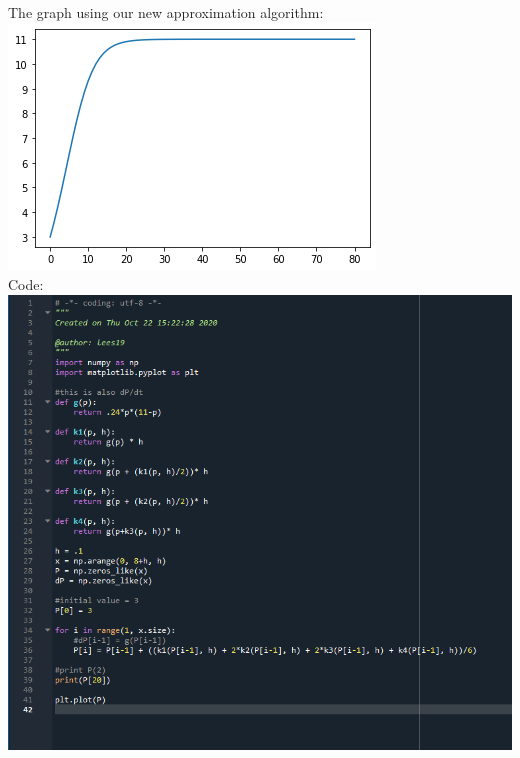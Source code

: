 \documentclass[12pt,letterpaper]{article}
\begin{document}
\begin{enumerate}
The graph using our new approximation algorithm: \\
\includegraphics{number6graph.png}\\

Code: \\
\includegraphics{number6code.png}

\end{enumerate}
\end{document}
